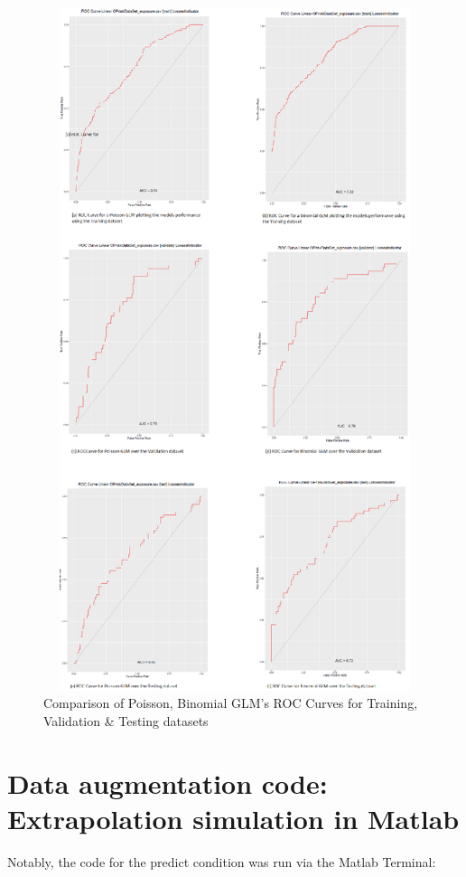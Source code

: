 \documentclass{DissertateUSU}
\begin{document}
\begin{figure}
\centering
\includegraphics[height=20cm, width=15cm]{ROC_Curves_All.eps}
\caption[ROC Curve comparison]{Comparison of Poisson, Binomial GLM's ROC Curves for Training, Validation \& Testing datasets}
\label{ROCCurveAll}
\end{figure}

\clearpage

\section{Data augmentation code: Extrapolation simulation in Matlab}
\label{sec:Data augmentation code: Extrapolation simulation in Matlab}

Notably, the code for the predict condition was run via the Matlab
Terminal:
\end{document}
